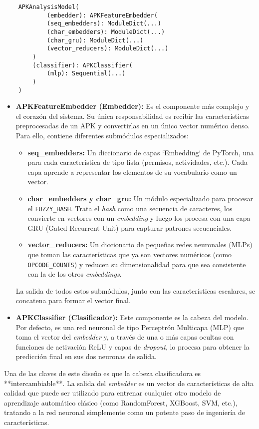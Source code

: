 \begin{verbatim}
	APKAnalysisModel(
			(embedder): APKFeatureEmbedder(
			(seq_embedders): ModuleDict(...)
			(char_embedders): ModuleDict(...)
			(char_gru): ModuleDict(...)
			(vector_reducers): ModuleDict(...)
		)
		(classifier): APKClassifier(
			(mlp): Sequential(...)
		)
	)
\end{verbatim}

\begin{itemize}
	\item \textbf{APKFeatureEmbedder (Embedder):} Es el componente más complejo y el corazón del sistema. Su única responsabilidad es recibir las características preprocesadas de un APK y convertirlas en un único vector numérico denso. Para ello, contiene diferentes submódulos especializados:
	\begin{itemize}
		\item \textbf{seq\_embedders:} Un diccionario de capas `Embedding` de PyTorch, una para cada característica de tipo lista (permisos, actividades, etc.). Cada capa aprende a representar los elementos de su vocabulario como un vector.
		\item \textbf{char\_embedders y char\_gru:} Un módulo especializado para procesar el \texttt{FUZZY\_HASH}. Trata el \textit{hash} como una secuencia de caracteres, los convierte en vectores con un \textit{embedding} y luego los procesa con una capa GRU (Gated Recurrent Unit) para capturar patrones secuenciales.
		\item \textbf{vector\_reducers:} Un diccionario de pequeñas redes neuronales (MLPs) que toman las características que ya son vectores numéricos (como \texttt{OPCODE\_COUNTS}) y reducen su dimensionalidad para que sea consistente con la de los otros \textit{embeddings}.
	\end{itemize}
	La salida de todos estos submódulos, junto con las características escalares, se concatena para formar el vector final.
	
	\item \textbf{APKClassifier (Clasificador):} Este componente es la cabeza del modelo. Por defecto, es una red neuronal de tipo Perceptrón Multicapa (MLP) que toma el vector del \textit{embedder} y, a través de una o más capas ocultas con funciones de activación ReLU y capas de \textit{dropout}, lo procesa para obtener la predicción final en sus dos neuronas de salida.
\end{itemize}

Una de las claves de este diseño es que la cabeza clasificadora es **intercambiable**. La salida del \textit{embedder} es un vector de características de alta calidad que puede ser utilizado para entrenar cualquier otro modelo de aprendizaje automático clásico (como RandomForest, XGBoost, SVM, etc.), tratando a la red neuronal simplemente como un potente paso de ingeniería de características.

